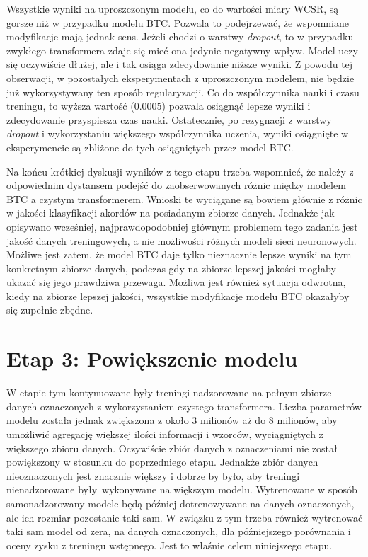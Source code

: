 Wszystkie wyniki na uproszczonym modelu, co do wartości miary WCSR, są gorsze niż w przypadku modelu BTC. Pozwala to podejrzewać, że wspomniane modyfikacje mają jednak sens. Jeżeli chodzi o warstwy \emph{dropout}, to w przypadku zwykłego transformera zdaje się mieć ona jedynie negatywny wpływ. Model uczy się oczywiście dłużej, ale i tak osiąga zdecydowanie niższe wyniki. Z powodu tej obserwacji, w pozostałych eksperymentach z uproszczonym modelem, nie będzie już wykorzystywany ten sposób regularyzacji. Co do współczynnika nauki i czasu treningu, to wyższa wartość  ($0.0005$) pozwala osiągnąć lepsze wyniki i zdecydowanie przyspiesza czas nauki. Ostatecznie, po rezygnacji z warstwy \emph{dropout} i wykorzystaniu większego współczynnika uczenia, wyniki osiągnięte w eksperymencie  są zbliżone do tych osiągniętych przez model BTC.

Na końcu krótkiej dyskusji wyników z tego etapu trzeba wspomnieć, że należy z odpowiednim dystansem podejść do zaobserwowanych różnic między modelem BTC a czystym transformerem. Wnioski te wyciągane są bowiem głównie z różnic w jakości klasyfikacji akordów na posiadanym zbiorze danych. Jednakże jak opisywano wcześniej, najprawdopodobniej głównym problemem tego zadania jest jakość danych treningowych, a nie możliwości różnych modeli sieci neuronowych. Możliwe jest zatem, że model BTC daje tylko nieznacznie lepsze wyniki na tym konkretnym zbiorze danych, podczas gdy na zbiorze lepszej jakości mogłaby ukazać się jego prawdziwa przewaga. Możliwa jest również sytuacja odwrotna, kiedy na zbiorze lepszej jakości, wszystkie modyfikacje modelu BTC okazałyby się zupełnie zbędne.



\section{Etap 3: Powiększenie modelu}

W etapie tym kontynuowane były treningi nadzorowane na pełnym zbiorze danych oznaczonych z wykorzystaniem czystego transformera. Liczba parametrów modelu została jednak zwiększona z około $3$ milionów aż do $8$ milionów, aby umożliwić agregację większej ilości informacji i wzorców, wyciągniętych z większego zbioru danych. Oczywiście zbiór danych z oznaczeniami nie został powiększony w stosunku do poprzedniego etapu. Jednakże zbiór danych nieoznaczonych jest znacznie większy i dobrze by było, aby treningi nienadzorowane były wykonywane na większym modelu. Wytrenowane w sposób samonadzorowany modele będą później dotrenowywane na danych oznaczonych, ale ich rozmiar pozostanie taki sam. W związku z tym trzeba również wytrenować taki sam model od zera, na danych oznaczonych, dla późniejszego porównania i oceny zysku z treningu wstępnego. Jest to właśnie celem niniejszego etapu.

